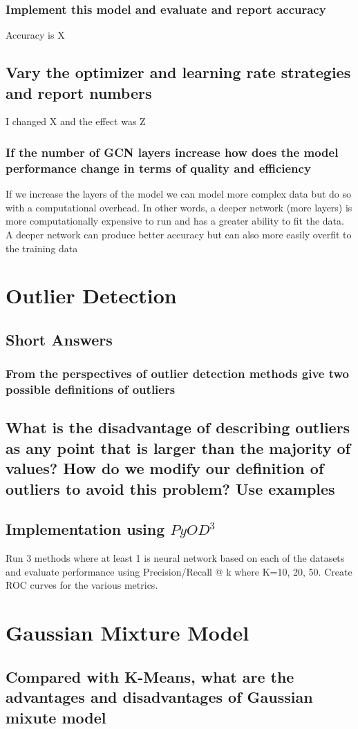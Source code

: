 \documentclass[11pt]{article}
\begin{document}
\subsubsection{Implement this model and evaluate and report accuracy}
Accuracy is X
\subsection{Vary the optimizer and learning rate strategies and report numbers}
I changed X and the effect was Z
\subsubsection{If the number of GCN layers increase how does the model performance change in terms of quality and efficiency}
If we increase the layers of the model we can model more complex data but do so with a computational overhead. In other words, a deeper network (more layers) is more computationally expensive to run and has a greater ability to fit the data. A deeper network can produce better accuracy but can also more easily overfit to the training data
\section{Outlier Detection}
\subsection{Short Answers}
\subsubsection{From the perspectives of outlier detection methods give two possible definitions of outliers}
\subsection{What is the disadvantage of describing outliers as any point that is larger than the majority of values? How do we modify our definition of outliers to avoid this problem? Use examples }
\subsection{Implementation using $PyOD^3$}
Run 3 methods where at least 1 is neural network based on each of the datasets and evaluate performance using Precision/Recall @ k where K=10, 20, 50.
Create ROC curves for the various metrics. 
\section{Gaussian Mixture Model}
\subsection{Compared with K-Means, what are the advantages and disadvantages of Gaussian mixute model}
\end{document}
